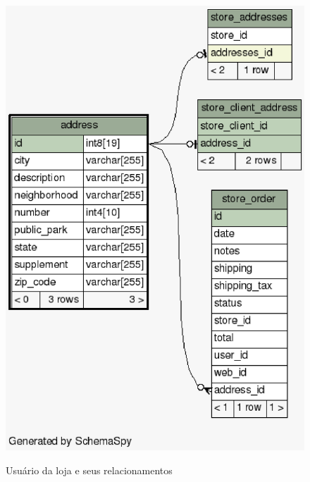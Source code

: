 \documentclass[a4paper,12pt]{monografia}
\begin{document}
\begin{figure}[H]
\centering
\caption{Usuário da loja e seus relacionamentos}
\centering
\includegraphics[scale=0.7]{img/diagramas/schema/address.1degree.png.eps}\\
\end{figure}
\end{document}
